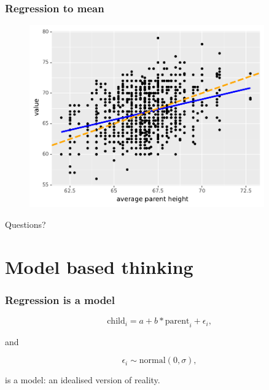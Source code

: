 \documentclass[handout]{beamer}
\begin{document}
\begin{frame}
	\frametitle{Regression to mean}
	
	\begin{figure}[ht]
		\centerline{\includegraphics[width=0.9\textwidth]{../figures/galton_regression_to_mean.pdf}}
	\end{figure}
	
\end{frame}

\begin{frame}
	
	\Large Questions?
\end{frame}

\section{Model based thinking}
\frame{\tableofcontents[currentsection]}

\begin{frame}
	\frametitle{Regression is a model}
	
	\begin{equation}
	\text{child}_i = a + b * \text{parent}_i + \epsilon_i,
	\end{equation}
	
	and
	
	\begin{equation}
	\epsilon_i \sim \text{normal}(0, \sigma),
	\end{equation}
	
	is a model: an idealised version of reality.
	
\end{frame}
\end{document}
